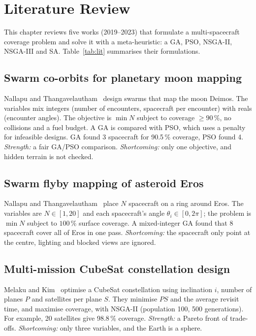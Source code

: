 \chapter{Literature Review}
\label{ch:background}

This chapter reviews five works (2019--2023) that formulate a multi-spacecraft coverage
problem and solve it with a meta-heuristic: a \acf{GA}, \acf{PSO}, \ac{NSGA}-II,
\ac{NSGA}-III and \acf{SA}. Table~\ref{tab:lit} summarises their formulations.

\section{Swarm co-orbits for planetary moon mapping}
Nallapu and Thangavelautham~\cite{nallapu2021} design swarms that map the moon Deimos.
The variables mix integers (number of encounters, spacecraft per encounter) with reals
(encounter angles). The objective is $\min N$ subject to coverage $\ge 90\,\%$, no
collisions and a fuel budget. A GA is compared with PSO, which uses a penalty for
infeasible designs. GA found 3 spacecraft for 90.5\,\% coverage, PSO found 4.
\emph{Strength:} a fair GA/PSO comparison. \emph{Shortcoming:} only one objective, and
hidden terrain is not checked.

\section{Swarm flyby mapping of asteroid Eros}
Nallapu and Thangavelautham~\cite{nallapu2019} place $N$ spacecraft on a ring around
Eros. The variables are $N\in[1,20]$ and each spacecraft's angle $\theta_i\in[0,2\pi]$;
the problem is $\min N$ subject to $100\,\%$ surface coverage. A mixed-integer GA found
that 8 spacecraft cover all of Eros in one pass. \emph{Shortcoming:} the spacecraft only point at the centre,
lighting and blocked views are ignored.

\section{Multi-mission CubeSat constellation design}
Melaku and Kim~\cite{melaku2023} optimise a CubeSat constellation using inclination $i$,
number of planes $P$ and satellites per plane $S$. They minimise $PS$ and the average
revisit time, and maximise coverage, with NSGA-II (population 100, 500 generations). For
example, 20 satellites give 98.8\,\% coverage. \emph{Strength:} a Pareto front of
trade-offs. \emph{Shortcoming:} only three variables, and the Earth is a sphere.

